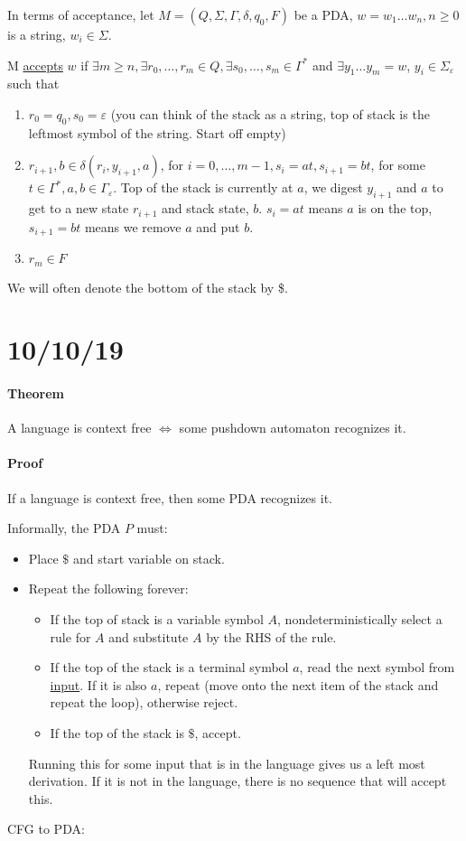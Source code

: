 \documentclass[12 pt]{article}
\begin{document}
In terms of acceptance, let $M = (Q, \Sigma, \Gamma, \delta, q_0, F)$
be a PDA, $w = w_1\ldots w_n, n \geq 0$ is a string, $w_i \in \Sigma$.

M \underline{accepts} $w$ if $\exists m \geq n, \exists r_0, \ldots,
r_m \in Q, \exists s_0, \ldots, s_m \in \Gamma^*$ and $\exists
y_1\ldots y_m = w$, $y_i \in \Sigma_\varepsilon$ such that
\begin{enumerate}
\item $r_0 = q_0, s_0 = \varepsilon$ (you can think of the stack as a
  string, top of stack is the leftmost symbol of the string. Start off
  empty)
\item $r_{i+1}, b \in \delta(r_i, y_{i+1}, a)$, for $i = 0, \ldots,
  m-1, s_i = at, s_{i+1}=bt$, for some $t \in \Gamma^*, a,b \in
  \Gamma_{\varepsilon}$. Top of the stack is currently at $a$, we
  digest $y_{i + 1}$ and $a$ to get to a new state $r_{i + 1}$ and stack state, $b$. $s_i = at$
  means $a$ is on the top, $s_{i+1} = bt$ means we remove $a$ and put $b$.
\item $r_m \in F$
\end{enumerate}
We will often denote the bottom of the stack by \$.
\section{10/10/19}
\paragraph{Theorem} A language is context free $\iff$ some pushdown
automaton recognizes it.
\paragraph{Proof} If a language is context free, then some PDA
recognizes it.

Informally, the PDA $P$ must:
\begin{itemize}
\item Place $\$$ and start variable on stack.
\item Repeat the following forever:
  \begin{itemize}
  \item If the top of stack is a variable symbol $A$,
    nondeterministically select a rule for $A$ and substitute $A$ by
    the RHS of the rule.
  \item If the top of the stack is a terminal symbol $a$, read the
    next symbol from \underline{input}. If it is also $a$, repeat
    (move onto the next item of the stack and repeat the loop), otherwise
    reject.
  \item If the top of the stack is $\$$, accept.
  \end{itemize}
  Running this for some input that is in the language gives us a left
  most derivation. If it is not in the language, there is no sequence
  that will accept this.
\end{itemize}
CFG to PDA:\
\end{document}
